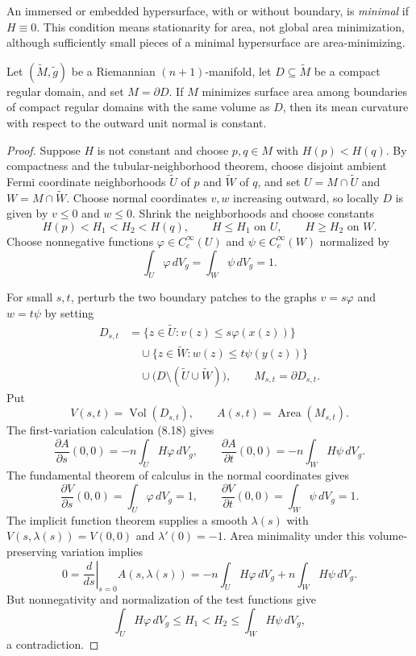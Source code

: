 An immersed or embedded hypersurface, with or without boundary, is
\emph{minimal} if $H\equiv0$. This condition means stationarity for area, not
global area minimization, although sufficiently small pieces of a minimal
hypersurface are area-minimizing.

\begin{theorem}
\label{thm:constant-mean-curvature-isoperimetric}
Let $(\widetilde M,\widetilde g)$ be a Riemannian $(n+1)$-manifold, let
$D\subseteq\widetilde M$ be a compact regular domain, and set $M=\partial D$.
If $M$ minimizes surface area among boundaries of compact regular domains with
the same volume as $D$, then its mean curvature with respect to the outward
unit normal is constant.
\end{theorem}

\begin{proof}
\sketch Suppose $H$ is not constant and choose $p,q\in M$ with
$H(p)<H(q)$. By compactness and the tubular-neighborhood theorem, choose
disjoint ambient Fermi coordinate neighborhoods $\widetilde U$ of $p$ and
$\widetilde W$ of $q$, and set
$U=M\cap\widetilde U$ and $W=M\cap\widetilde W$. Choose normal coordinates
$v,w$ increasing outward, so locally $D$ is given by $v\leq0$ and $w\leq0$.
Shrink the neighborhoods and choose constants
\[
H(p)<H_1<H_2<H(q),
\qquad H\leq H_1\text{ on }U,
\qquad H\geq H_2\text{ on }W.
\]
Choose nonnegative functions
$\varphi\in C_c^\infty(U)$ and $\psi\in C_c^\infty(W)$ normalized by
\[
\int_U\varphi\,dV_g=\int_W\psi\,dV_g=1.
\]

For small $s,t$, perturb the two boundary patches to the graphs
$v=s\varphi$ and $w=t\psi$ by setting
\begin{align*}
D_{s,t}
&=\{z\in\widetilde U:v(z)\leq s\varphi(x(z))\}\\
&\quad\cup\{z\in\widetilde W:w(z)\leq t\psi(y(z))\}\\
&\quad\cup\bigl(D\setminus(\widetilde U\cup\widetilde W)\bigr),
\qquad M_{s,t}=\partial D_{s,t}.
\end{align*}
Put
\[
V(s,t)=\operatorname{Vol}(D_{s,t}),
\qquad A(s,t)=\operatorname{Area}(M_{s,t}).
\]
The first-variation calculation (8.18) gives
\[
\frac{\partial A}{\partial s}(0,0)
=-n\int_UH\varphi\,dV_g,
\qquad
\frac{\partial A}{\partial t}(0,0)
=-n\int_WH\psi\,dV_g.
\]
The fundamental theorem of calculus in the normal coordinates gives
\[
\frac{\partial V}{\partial s}(0,0)
=\int_U\varphi\,dV_g=1,
\qquad
\frac{\partial V}{\partial t}(0,0)
=\int_W\psi\,dV_g=1.
\]
The implicit function theorem supplies a smooth $\lambda(s)$ with
$V(s,\lambda(s))=V(0,0)$ and $\lambda'(0)=-1$. Area minimality under this
volume-preserving variation implies
\[
0=\left.\frac d{ds}\right|_{s=0}A(s,\lambda(s))
=-n\int_UH\varphi\,dV_g+n\int_WH\psi\,dV_g.
\]
But nonnegativity and normalization of the test functions give
\[
\int_UH\varphi\,dV_g
\leq H_1<H_2
\leq\int_WH\psi\,dV_g,
\]
a contradiction.
\end{proof}

